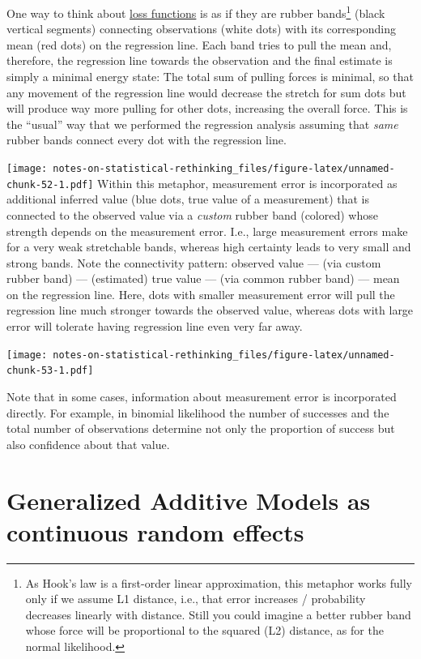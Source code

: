 \documentclass[
]{book}
\begin{document}
One way to think about \protect\hyperlink{loss-functions}{loss functions} is as if they are rubber bands\footnote{As Hook's law is a first-order linear approximation, this metaphor works fully only if we assume L1 distance, i.e., that error increases / probability decreases linearly with distance. Still you could imagine a better rubber band whose force will be proportional to the squared (L2) distance, as for the normal likelihood.} (black vertical segments) connecting observations (white dots) with its corresponding mean (red dots) on the regression line. Each band tries to pull the mean and, therefore, the regression line towards the observation and the final estimate is simply a minimal energy state: The total sum of pulling forces is minimal, so that any movement of the regression line would decrease the stretch for sum dots but will produce way more pulling for other dots, increasing the overall force. This is the ``usual'' way that we performed the regression analysis assuming that \emph{same} rubber bands connect every dot with the regression line.

\texttt{[image: notes-on-statistical-rethinking\_files/figure-latex/unnamed-chunk-52-1.pdf]}
Within this metaphor, measurement error is incorporated as additional inferred value (blue dots, true value of a measurement) that is connected to the observed value via a \emph{custom} rubber band (colored) whose strength depends on the measurement error. I.e., large measurement errors make for a very weak stretchable bands, whereas high certainty leads to very small and strong bands. Note the connectivity pattern: observed value --- (via custom rubber band) --- (estimated) true value --- (via common rubber band) --- mean on the regression line. Here, dots with smaller measurement error will pull the regression line much stronger towards the observed value, whereas dots with large error will tolerate having regression line even very far away.

\texttt{[image: notes-on-statistical-rethinking\_files/figure-latex/unnamed-chunk-53-1.pdf]}

Note that in some cases, information about measurement error is incorporated directly. For example, in binomial likelihood the number of successes and the total number of observations determine not only the proportion of success but also confidence about that value.

\hypertarget{generalized-additive-models-as-continuous-random-effects}{%
\chapter{Generalized Additive Models as continuous random effects}\label{generalized-additive-models-as-continuous-random-effects}}
\end{document}
